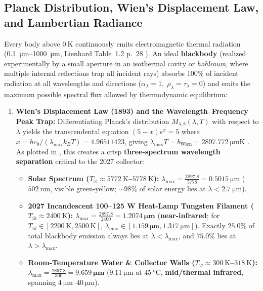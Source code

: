 \subsection{Planck Distribution, Wien's Displacement Law, and Lambertian Radiance}
Every body above $\SI{0}{\kelvin}$ continuously emits electromagnetic thermal radiation (\SIrange{0.1}{1000}{\micro\meter}, Lienhard Table~1.2 p.~28 ). An ideal \textbf{blackbody} (realized experimentally by a small aperture in an isothermal cavity or \emph{hohlraum}, where multiple internal reflections trap all incident rays) absorbs $100\%$ of incident radiation at all wavelengths and directions ($\alpha_\lambda = 1,\; \rho_\lambda = \tau_\lambda = 0$) and emits the maximum possible spectral flux allowed by thermodynamic equilibrium:
\begin{enumerate}
  \item \textbf{Wien's Displacement Law (1893) and the Wavelength--Frequency Peak Trap:} Differentiating Planck's distribution $M_{\lambda,b}(\lambda,T)$ with respect to $\lambda$ yields the transcendental equation $(5 - x)e^x = 5$ where $x = h c_0 / (\lambda_{\max} k_B T) = 4.96511423$, giving $\lambda_{\max} T = b_{\mathrm{Wien}} = \SI{2897.772}{\micro\meter\kelvin}$ . As plotted in , this creates a crisp \textbf{three-spectrum wavelength separation} critical to the 2027 collector:
  \begin{itemize}
    \item \textbf{Solar Spectrum ($T_\odot \approx \SI{5772}{\kelvin}$--$\SI{5778}{\kelvin}$):} $\lambda_{\max} = \frac{2897.8}{5778} = \SI{0.5015}{\micro\meter}$ ($\SI{502}{\nano\meter}$, visible green-yellow; $\sim 98\%$ of solar energy lies at $\lambda < \SI{2.7}{\micro\meter}$).
    \item \textbf{2027 Incandescent 100--125 W Heat-Lamp Tungsten Filament ($T_{\mathrm{fil}} \approx \SI{2400}{\kelvin}$):} $\lambda_{\max} = \frac{2897.8}{2400} = \mathbf{\SI{1.2074}{\micro\meter}}$ (\textbf{near-infrared}; for $T_{\mathrm{fil}} \in [\SI{2200}{\kelvin}, \SI{2500}{\kelvin}]$, $\lambda_{\max} \in [\SI{1.159}{\micro\meter}, \SI{1.317}{\micro\meter}]$). Exactly $25.0\%$ of total blackbody emission always lies at $\lambda < \lambda_{\max}$, and $75.0\%$ lies at $\lambda > \lambda_{\max}$.
    \item \textbf{Room-Temperature Water \& Collector Walls ($T_w \approx \SI{300}{\kelvin}$--$\SI{318}{\kelvin}$):} $\lambda_{\max} = \frac{2897.8}{300} = \mathbf{\SI{9.659}{\micro\meter}}$ ($\SI{9.11}{\micro\meter}$ at $\SI{45}{\celsius}$, \textbf{mid/thermal infrared}, spanning $\SIrange{4}{40}{\micro\meter}$).

\end{itemize}
\end{enumerate}
